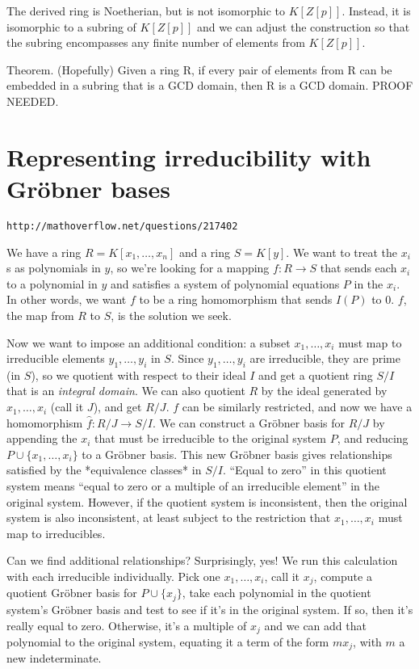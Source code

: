 \documentclass{article}
\begin{document}
The derived ring is Noetherian, but is not isomorphic to $K[Z[p]]$.
Instead, it is isomorphic to a subring of $K[Z[p]]$ and we can adjust
the construction so that the subring encompasses any finite number of
elements from $K[Z[p]]$.

Theorem.  (Hopefully) Given a ring R, if every pair of elements from R can be
embedded in a subring that is a GCD domain, then R is a GCD domain.
PROOF NEEDED.

\vfill\eject
\section*{Representing irreducibility with Gr\"obner bases}

\centerline{\tt http://mathoverflow.net/questions/217402}

We have a ring $R=K[x_1,\ldots,x_n]$ and a ring $S=K[y]$.  We want to
treat the $x_i$s as polynomials in $y$, so we're looking for a mapping
$f:R\to S$ that sends each $x_i$ to a polynomial in $y$ and satisfies
a system of polynomial equations $P$ in the $x_i$.  In other words, we
want $f$ to be a ring homomorphism that sends $I(P)$ to 0.  $f$, the
map from $R$ to $S$, is the solution we seek.

Now we want to impose an additional condition: a subset
$x_1,\ldots,x_i$ must map to irreducible elements $y_1,\ldots,y_i$ in
$S$.  Since $y_1,\ldots,y_i$ are irreducible, they are prime (in $S$),
so we quotient with respect to their ideal $I$ and get a quotient ring
$S/I$ that is an {\it integral domain}.  We can also quotient $R$ by the
ideal generated by $x_1,\ldots,x_i$ (call it $J$), and get $R/J$.  $f$
can be similarly restricted, and now we have a homomorphism $\hat{f}:
R/J \to S/I$.  We can construct a Gr\"obner basis for $R/J$ by appending
the $x_i$ that must be irreducible to the original system $P$, and
reducing $P \cup \{x_1,\ldots,x_i\}$ to a Gr\"obner basis.  This new
Gr\"obner basis gives relationships satisfied by the *equivalence
classes* in $S/I$.  ``Equal to zero'' in this quotient system means
``equal to zero or a multiple of an irreducible element'' in the
original system. However, if the quotient system is inconsistent, then
the original system is also inconsistent, at least subject to the
restriction that $x_1,\ldots,x_i$ must map to irreducibles.

Can we find additional relationships?  Surprisingly, yes!  We run this
calculation with each irreducible individually.  Pick one
$x_1,\ldots,x_i$, call it $x_j$, compute a quotient Gr\"obner basis for
$P \cup \{x_j\}$, take each polynomial in the quotient system's
Gr\"obner basis and test to see if it's in the original system.  If so,
then it's really equal to zero.  Otherwise, it's a multiple of $x_j$
and we can add that polynomial to the original system, equating it a
term of the form $m x_j$, with $m$ a new indeterminate.
\end{document}
